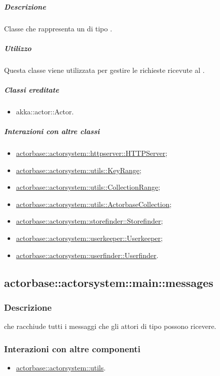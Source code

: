 \documentclass{scalatekids-article}
\begin{document}
\subparagraph{Descrizione}
Classe che rappresenta un  di tipo .

\subparagraph{Utilizzo}
Questa classe viene utilizzata per gestire le richieste ricevute al
.

\subparagraph{Classi ereditate}
\begin{itemize}
\item akka::actor::Actor.
\end{itemize}

\subparagraph{Interazioni con altre classi}
\begin{itemize}
\item \hyperref[sec:actorbase::actorsystem::httpserver::HTTPServer]{actorbase::actorsystem::httpserver::HTTPServer};
\item \hyperref[sec:actorbase::actorsystem::utils::KeyRange]{actorbase::actorsystem::utils::KeyRange};
\item \hyperref[sec:actorbase::actorsystem::utils::CollectionRange]{actorbase::actorsystem::utils::CollectionRange};
\item \hyperref[sec:actorbase::actorsystem::utils::ActorbaseCollection]{actorbase::actorsystem::utils::ActorbaseCollection};
\item \hyperref[sec:actorbase::actorsystem::storefinder::Storefinder]{actorbase::actorsystem::storefinder::Storefinder};
\item \hyperref[sec:actorbase::actorsystem::userkeeper::Userkeeper]{actorbase::actorsystem::userkeeper::Userkeeper};
\item \hyperref[sec:actorbase::actorsystem::userfinder::Userfinder]{actorbase::actorsystem::userfinder::Userfinder}.
\end{itemize}

\subsection{actorbase::actorsystem::main::messages}
\label{sec:actorbase::actorsystem::main::messages}

\subsubsection{Descrizione}
 che racchiude tutti i messaggi che gli attori di tipo
 possono ricevere.

\subsubsection{Interazioni con altre componenti}
\begin{itemize}
\item \hyperref[sec:actorbase::actorsystem::utils]{actorbase::actorsystem::utils}.
\end{itemize}
\end{document}

